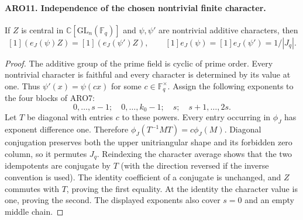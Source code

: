 \paragraph{ARO11. Independence of the chosen nontrivial finite character.}
\label{claim:ARO11}
If \(Z\) is central in \(\mathbb C[\mathrm{GL}_n(\mathbb F_q)]\)
and \(\psi,\psi'\) are nontrivial additive characters, then
\[
 [1](e_J(\psi)Z)=[1](e_J(\psi')Z),
 \qquad [1]e_J(\psi)=[1]e_J(\psi')=1/|J_q|.
 \tag{ARO.13}
\]
\begin{proof}
The additive group of the prime field is cyclic of prime order.
Every nontrivial character is faithful and every character is
determined by its value at one.  Thus
\(\psi'(x)=\psi(cx)\) for some \(c\in\mathbb F_q^\times\).
Assign the following exponents to the four blocks of ARO7:
\[
 0,\ldots,s-1;\quad 0,\ldots,k_0-1;\quad s;\quad
                                  s+1,\ldots,2s.
\]
Let \(T\) be diagonal with entries \(c\) to these powers.
Every entry occurring in \(\phi_J\) has exponent difference one.
Therefore \(\phi_J(T^{-1}MT)=c\phi_J(M)\).  Diagonal conjugation
preserves both the upper unitriangular shape and its forbidden
zero column, so it permutes \(J_q\).  Reindexing the character
average shows that the two idempotents are conjugate by \(T\)
(with the direction reversed if the inverse convention is used).
The identity coefficient of a conjugate is unchanged, and \(Z\)
commutes with \(T\), proving the first equality.  At the identity
the character value is one, proving the second.  The displayed
exponents also cover \(s=0\) and an empty middle chain.
\end{proof}

